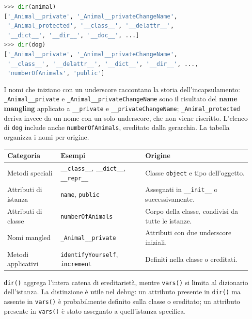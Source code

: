 \documentclass[12pt]{extarticle}
\begin{document}
\begin{lstlisting}[language=Python]
>>> dir(animal)
['_Animal__private', '_Animal__privateChangeName',
 '_Animal_protected', '__class__', '__delattr__',
 '__dict__', '__dir__', '__doc__', ...]
>>> dir(dog)
['_Animal__private', '_Animal__privateChangeName',
 '__class__', '__delattr__', '__dict__', '__dir__', ...,
 'numberOfAnimals', 'public']
\end{lstlisting}

\noindent I nomi che iniziano con un underscore raccontano la storia dell'incapsulamento: \texttt{\_Animal\_\_private} e \texttt{\_Animal\_\_privateChangeName} sono il risultato del \textbf{name mangling} applicato a \texttt{\_\_private} e \texttt{\_\_privateChangeName}; \texttt{\_Animal\_protected} deriva invece da un nome con un solo underscore, che non viene riscritto. L'elenco di \texttt{dog} include anche \texttt{numberOfAnimals}, ereditato dalla gerarchia. La tabella organizza i nomi per origine.

\begin{center}
\small
\begin{tabular}{p{3.4cm}p{7.4cm}p{4.4cm}}
    \toprule
    \textbf{Categoria} & \textbf{Esempi} & \textbf{Origine} \\
    \midrule
    Metodi speciali & \texttt{\_\_class\_\_}, \texttt{\_\_dict\_\_}, \texttt{\_\_repr\_\_} & Classe \texttt{object} e tipo dell'oggetto. \\
    \addlinespace
    Attributi di istanza & \texttt{name}, \texttt{public} & Assegnati in \texttt{\_\_init\_\_} o successivamente. \\
    \addlinespace
    Attributi di classe & \texttt{numberOfAnimals} & Corpo della classe, condivisi da tutte le istanze. \\
    \addlinespace
    Nomi mangled & \texttt{\_Animal\_\_private} & Attributi con due underscore iniziali. \\
    \addlinespace
    Metodi applicativi & \texttt{identifyYourself}, \texttt{increment} & Definiti nella classe o ereditati. \\
    \bottomrule
\end{tabular}
\end{center}

\noindent \texttt{dir()} aggrega l'intera catena di ereditarietà, mentre \texttt{vars()} si limita al dizionario dell'istanza. La distinzione è utile nel debug: un attributo presente in \texttt{dir()} ma assente in \texttt{vars()} è probabilmente definito sulla classe o ereditato; un attributo presente in \texttt{vars()} è stato assegnato a quell'istanza specifica.
\end{document}
